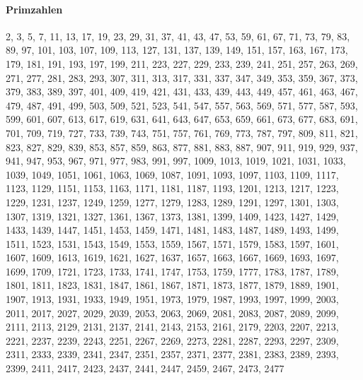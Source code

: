 \documentclass[8pt,a4paper,landscape]{article}
\begin{document}
\paragraph{Primzahlen}
\footnotesize 2,     3,     5,     7,    11,    13,    17,    19,    23,    29,    31,    37,    41,    43,
   47,    53,    59,    61,    67,    71,    73,    79,    83,    89,    97,   101,   103,   107,
  109,   113,   127,   131,   137,   139,   149,   151,   157,   163,   167,   173,   179,   181,
  191,   193,   197,   199,   211,   223,   227,   229,   233,   239,   241,   251,   257,   263,
  269,   271,   277,   281,   283,   293,   307,   311,   313,   317,   331,   337,   347,   349,
  353,   359,   367,   373,   379,   383,   389,   397,   401,   409,   419,   421,   431,   433,
  439,   443,   449,   457,   461,   463,   467,   479,   487,   491,   499,   503,   509,   521,
  523,   541,   547,   557,   563,   569,   571,   577,   587,   593,   599,   601,   607,   613,
  617,   619,   631,   641,   643,   647,   653,   659,   661,   673,   677,   683,   691,   701,
  709,   719,   727,   733,   739,   743,   751,   757,   761,   769,   773,   787,   797,   809,
  811,   821,   823,   827,   829,   839,   853,   857,   859,   863,   877,   881,   883,   887,
  907,   911,   919,   929,   937,   941,   947,   953,   967,   971,   977,   983,   991,   997,
 1009,  1013,  1019,  1021,  1031,  1033,  1039,  1049,  1051,  1061,  1063,  1069,  1087,  1091,
 1093,  1097,  1103,  1109,  1117,  1123,  1129,  1151,  1153,  1163,  1171,  1181,  1187,  1193,
 1201,  1213,  1217,  1223,  1229,  1231,  1237,  1249,  1259,  1277,  1279,  1283,  1289,  1291,
 1297,  1301,  1303,  1307,  1319,  1321,  1327,  1361,  1367,  1373,  1381,  1399,  1409,  1423,
 1427,  1429,  1433,  1439,  1447,  1451,  1453,  1459,  1471,  1481,  1483,  1487,  1489,  1493,
 1499,  1511,  1523,  1531,  1543,  1549,  1553,  1559,  1567,  1571,  1579,  1583,  1597,  1601,
 1607,  1609,  1613,  1619,  1621,  1627,  1637,  1657,  1663,  1667,  1669,  1693,  1697,  1699,
 1709,  1721,  1723,  1733,  1741,  1747,  1753,  1759,  1777,  1783,  1787,  1789,  1801,  1811,
 1823,  1831,  1847,  1861,  1867,  1871,  1873,  1877,  1879,  1889,  1901,  1907,  1913,  1931,
 1933,  1949,  1951,  1973,  1979,  1987,  1993,  1997,  1999,  2003,  2011,  2017,  2027,  2029,
 2039,  2053,  2063,  2069,  2081,  2083,  2087,  2089,  2099,  2111,  2113,  2129,  2131,  2137,
 2141,  2143,  2153,  2161,  2179,  2203,  2207,  2213,  2221,  2237,  2239,  2243,  2251,  2267,
 2269,  2273,  2281,  2287,  2293,  2297,  2309,  2311,  2333,  2339,  2341,  2347,  2351,  2357,
 2371,  2377,  2381,  2383,  2389,  2393,  2399,  2411,  2417,  2423,  2437,  2441,  2447,  2459,
 2467,  2473,  2477
\end{document}
